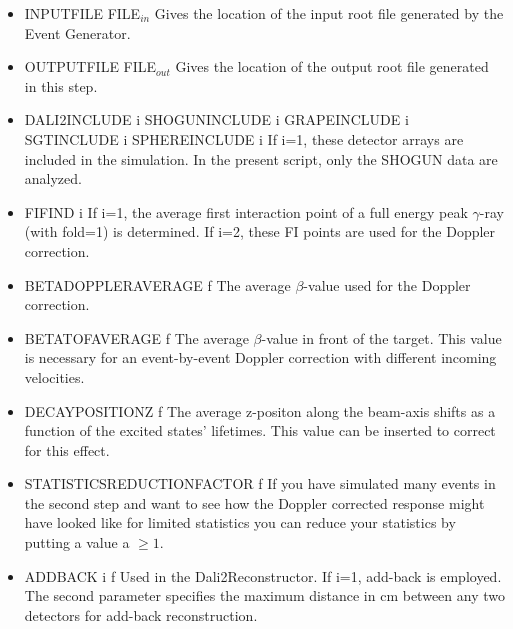 \documentclass[12pt]{book}
\begin{document}
\begin{itemize}
\item INPUTFILE FILE$_{in}$ \hfill{} \linebreak
  Gives the location of the input root file generated by the Event Generator.
\item OUTPUTFILE FILE$_{out}$ \hfill{} \linebreak
  Gives the location of the output root file generated in this step.
\item DALI2INCLUDE i\hfill{} \linebreak
  SHOGUNINCLUDE i\hfill{} \linebreak
  GRAPEINCLUDE i\hfill{} \linebreak
  SGTINCLUDE i\hfill{} \linebreak
  SPHEREINCLUDE i\hfill{} \linebreak
  If i=1, these detector arrays are included in the simulation. 
  In the present script, only the SHOGUN data are analyzed.
\item FIFIND i\hfill{} \linebreak
  If i=1, the average first interaction point of a full energy peak $\gamma$-ray (with fold=1) is determined.
  If i=2, these FI points are used for the Doppler correction. 
\item BETADOPPLERAVERAGE f \hfill{} \linebreak
  The average $\beta$-value used for the Doppler correction.
\item BETATOFAVERAGE f \hfill{} \linebreak
  The average $\beta$-value in front of the target. This value is necessary for an event-by-event
  Doppler correction with different incoming velocities.
\item DECAYPOSITIONZ f\hfill{} \linebreak
  The average z-positon along the beam-axis shifts as a function of the excited states' lifetimes. This
  value can be inserted to correct for this effect.
\item STATISTICSREDUCTIONFACTOR f\hfill{} \linebreak
  If you have simulated many events in the second step and want to see how the Doppler corrected response might
  have looked like for limited statistics you can reduce your statistics by putting a value a $\ge 1$.
\item ADDBACK i f\hfill{} \linebreak
  Used in the Dali2Reconstructor. If i=1, add-back is employed. The second parameter
  specifies the maximum distance in cm between any two detectors for add-back reconstruction. 

\end{itemize}
\end{document}

